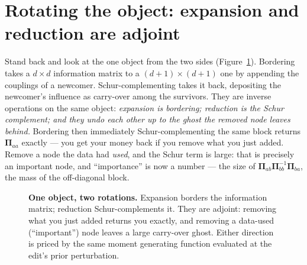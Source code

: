 \documentclass[11pt]{article}
\newcommand{\Prec}{\bm{\Pi}}        %
\theoremstyle{definition}
\begin{document}
\section{Rotating the object: expansion and reduction are adjoint}

Stand back and look at the one object from the two sides
(Figure~\ref{fig:rotate}). Bordering takes a $d\times d$ information matrix
to a $(d{+}1)\times(d{+}1)$ one by appending the couplings of a newcomer.
Schur-complementing takes it back, depositing the newcomer's influence as
carry-over among the survivors. They are inverse operations on the same
object: \emph{expansion is bordering; reduction is the Schur complement;
and they undo each other up to the ghost the removed node leaves behind.}
Bordering then immediately Schur-complementing the same block returns
$\Prec_{aa}$ exactly --- you get your money back if you remove what you
just added. Remove a node the data had \emph{used}, and the Schur term is
large: that is precisely an important node, and ``importance'' is now a
number --- the size of $\Prec_{ab}\Prec_{bb}^{-1}\Prec_{ba}$, the mass of
the off-diagonal block.

\begin{figure}[ht]
\centering
{}
\caption{\textbf{One object, two rotations.} Expansion borders the
information matrix; reduction Schur-complements it. They are adjoint:
removing what you just added returns you exactly, and removing a
data-used (``important'') node leaves a large carry-over ghost. Either
direction is priced by the same moment generating function evaluated at
the edit's prior perturbation.}
\label{fig:rotate}
\end{figure}
\end{document}
